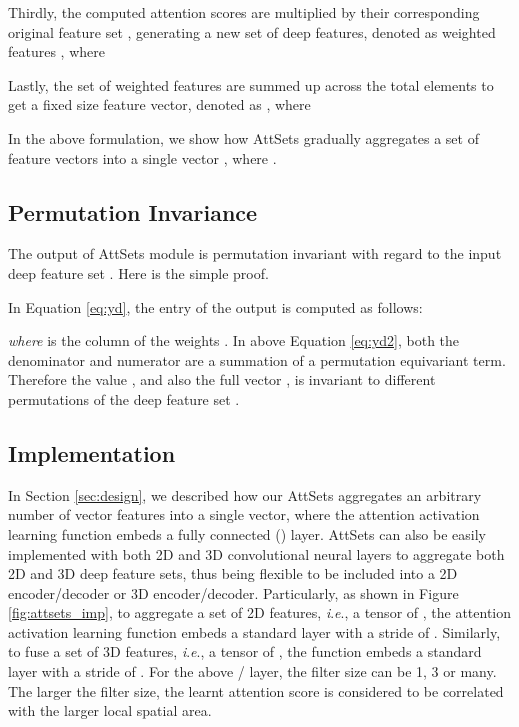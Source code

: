 \documentclass[twocolumn]{svjour3}    \pdfoutput=1
\newcommand{\nickname}{AttSets}
\newcommand{\ie}{\textit{i}.\textit{e}., }
\begin{document}
Thirdly, the computed attention scores  are multiplied by their corresponding original feature set , generating a new set of deep features, denoted as weighted features , where
\begin{ceqn}

\end{ceqn}

Lastly, the set of weighted features  are summed up across the total  elements to get a fixed size feature vector, denoted as , where


In the above formulation, we show how \nickname{} gradually aggregates a set of  feature vectors  into a single vector , where . 

\subsection{Permutation Invariance}
The output of \nickname{} module  is permutation invariant with regard to the input deep feature set . Here is the simple proof. 


In Equation \ref{eq:yd}, the  entry of the output  is computed as follows:
\begin{ceqn}

\end{ceqn}
\textit{where}  is the  column of the weights . In above Equation \ref{eq:yd2}, both the denominator and numerator are a summation of a permutation equivariant term. Therefore the value , and also the full vector , is invariant to different permutations of the deep feature set  \citep{Zaheer2017}. 

\subsection{Implementation}\label{sec:impl}
In Section \ref{sec:design}, we described how our \nickname{} aggregates an arbitrary number of vector features into a single vector, where the attention activation learning function  embeds a fully connected () layer. \nickname{} can also be easily implemented with both 2D and 3D convolutional neural layers to aggregate both 2D and 3D deep feature sets, thus being flexible to be included into a 2D encoder/decoder or 3D encoder/decoder. Particularly, as shown in Figure \ref{fig:attsets_imp}, to aggregate a set of 2D features, \ie a tensor of , the attention activation learning function  embeds a standard  layer with a stride of . Similarly, to fuse a set of 3D features, \ie a tensor of , the function  embeds a standard  layer with a stride of . For the above / layer, the filter size can be 1, 3 or many. The larger the filter size, the learnt attention score is considered to be correlated with the larger local spatial area.
\end{document}
